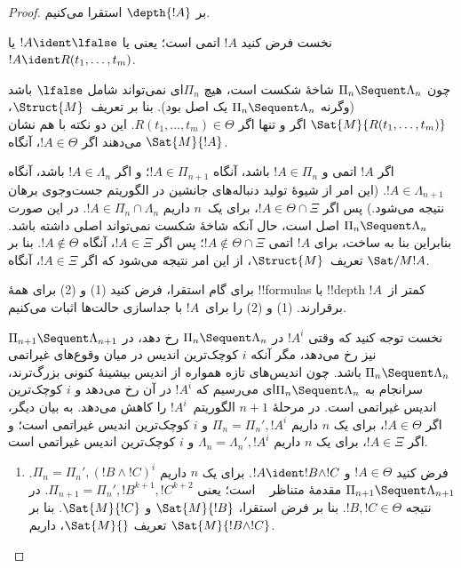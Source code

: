 \documentclass[../../../include/open-logic-section]{subfiles}
\begin{document}
\begin{proof}
  بر $\depth{!A}$ استقرا می‌کنیم.

نخست فرض کنید $!A$ اتمی است؛ یعنی یا $!A \ident \lfalse$ یا
$!A \ident R(t_1, \dots, t_m)$.

چون $\Pi_n \Sequent \Lambda_n$ شاخهٔ شکست است، هیچ $\Pi_n$ای
نمی‌تواند شامل $\lfalse$ باشد (وگرنه
$\Pi_n \Sequent \Lambda_n$ یک اصل بود). بنا بر تعریف~$\Struct{M}$،
$\Sat{M}{R(t_1, \dots, t_m)}$ اگر و تنها اگر
$R(t_1, \dots, t_m) \in \Theta$. این دو نکته با هم نشان می‌دهند اگر
$!A \in \Theta$، آنگاه $\Sat{M}{!A}$.

اگر $!A$ اتمی و $!A \in \Pi_n$ باشد، آنگاه
$!A \in \Pi_{n+1}$؛ و اگر $!A \in \Lambda_n$ باشد، آنگاه
$!A \in \Lambda_{n+1}$. (این امر از شیوهٔ تولید دنباله‌های جانشین در
الگوریتم جست‌وجوی برهان نتیجه می‌شود.) پس اگر
$!A \in \Theta \cap \Xi$، برای یک~$n$ داریم
$!A \in \Pi_n \cap \Lambda_n$. در این صورت
$\Pi_n \Sequent \Lambda_n$ اصل است، حال آنکه شاخهٔ شکست نمی‌تواند
اصلی داشته باشد. بنابراین بنا به ساخت، برای $!A$ اتمی
$!A \notin \Theta \cap \Xi$؛ پس اگر $!A \in \Xi$، آنگاه
$!A \notin \Theta$. بنا بر تعریف~$\Struct{M}$، از این امر نتیجه
می‌شود که اگر $!A \in \Xi$، آنگاه $\Sat/{M}{!A}$.

برای گام استقرا، فرض کنید (1) و (2) برای همهٔ !!{formula}s با
!!{depth} کمتر از~$!A$ برقرارند. (1) و (2) را برای~$!A$ با جداسازی
حالت‌ها اثبات می‌کنیم.

نخست توجه کنید که وقتی $!A^i$ در
$\Pi_n \Sequent \Lambda_n$ رخ دهد، در
$\Pi_{n+1} \Sequent \Lambda_{n+1}$ نیز رخ می‌دهد، مگر آنکه $i$
کوچک‌ترین اندیس در میان وقوع‌های غیراتمی
$\Pi_n \Sequent \Lambda_n$ باشد. چون اندیس‌های تازه همواره از اندیس
بیشینهٔ کنونی بزرگ‌ترند، سرانجام به
$\Pi_n \Sequent \Lambda_n$ای می‌رسیم که $!A^i$ در آن رخ می‌دهد و
$i$ کوچک‌ترین اندیس غیراتمی است. در مرحلهٔ $n+1$ الگوریتم~$!A^i$ را
کاهش می‌دهد. به بیان دیگر، اگر $!A \in \Theta$، برای یک $n$ داریم
$\Pi_n = \Pi_n', !A^i$ و $i$ کوچک‌ترین اندیس غیراتمی است؛ و اگر
$!A \in \Xi$، برای یک $n$ داریم
$\Lambda_n = \Lambda_n', !A^i$ و $i$ کوچک‌ترین اندیس غیراتمی است.

\begin{enumerate}
  \item فرض کنید $!A \in \Theta$ و
  $!A \ident !B \land !C$. برای یک $n$ داریم
  $\Pi_n = \Pi_n', (!B \land !C)^i$.
  $\Pi_{n+1} \Sequent \Lambda_{n+1}$ مقدمهٔ متناظر
  ~\LeftR{\land} است؛ یعنی
  $\Pi_{n+1} = \Pi_n', !B^{k+1}, !C^{k+2}$. در نتیجه
  $!B, !C \in \Theta$. بنا بر فرض استقرا، $\Sat{M}{!B}$ و
  $\Sat{M}{!C}$. بنا بر تعریف $\Sat{M}{}$، داریم
  $\Sat{M}{!B \land !C}$.


\end{enumerate}
\end{proof}
\end{document}
